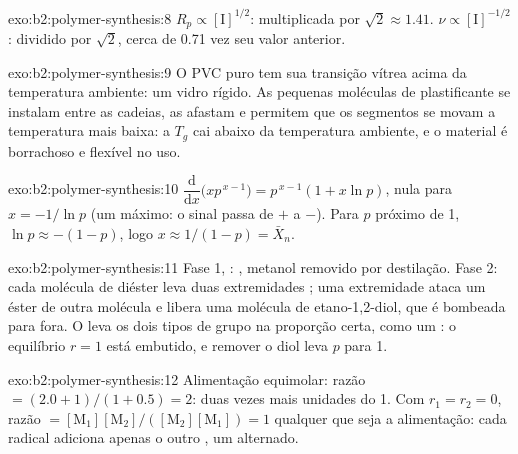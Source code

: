 \begin{solution}{exo:b2:polymer-synthesis:8}
$R_p \propto [\mathrm I]^{1/2}$: multiplicada por $\sqrt2 \approx 1.41$. $\nu \propto [\mathrm I]^{-1/2}$:
dividido por $\sqrt 2$, cerca de 0.71 vez seu valor anterior.
\end{solution}

\begin{solution}{exo:b2:polymer-synthesis:9}
O PVC puro tem sua transição vítrea acima da temperatura ambiente: um vidro rígido. As pequenas
moléculas de plastificante se instalam entre as cadeias, as afastam e permitem que os segmentos se movam a
temperatura mais baixa: a $T_g$ cai abaixo da temperatura ambiente, e o material é borrachoso e flexível
no uso.
\end{solution}

\begin{solution}{exo:b2:polymer-synthesis:10}
$\dfrac{\mathrm d}{\mathrm dx}\bigl(x p^{\,x-1}\bigr) = p^{\,x-1}(1 + x\ln p)$, nula para $x = -1/\ln p$
(um máximo: o sinal passa de $+$ a $-$). Para $p$ próximo de 1, $\ln p \approx -(1-p)$, logo $x \approx
1/(1-p) = \bar X_n$.
\end{solution}

\begin{solution}{exo:b2:polymer-synthesis:11}
Fase 1, : , metanol
removido por destilação. Fase 2: cada molécula de diéster leva duas extremidades ; uma
extremidade ataca um éster de outra molécula e libera uma molécula de etano-1,2-diol, que é bombeada
para fora. O  leva os dois tipos de grupo na proporção certa, como um  : o
equilíbrio $r = 1$ está embutido, e remover o diol leva $p$ para 1.
\end{solution}

\begin{solution}{exo:b2:polymer-synthesis:12}
Alimentação equimolar: razão $= (2.0 + 1)/(1 + 0.5) = 2$: duas vezes mais unidades do  1. Com $r_1 = r_2 =
0$, razão $= [\mathrm M_1][\mathrm M_2]/([\mathrm M_2][\mathrm M_1]) = 1$ qualquer que seja a alimentação: cada
radical adiciona apenas o outro , um  alternado.
\end{solution}

